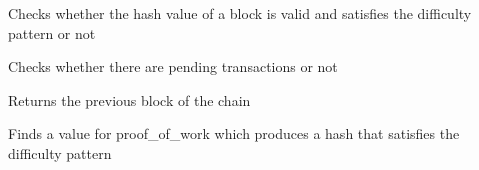 \documentclass[letterpaper,10pt,english]{sphinxmanual}
\begin{document}
\begin{fulllineitems}
\begin{fulllineitems}
\end{fulllineitems}


\begin{fulllineitems}
\label{\detokenize{index:blockchain.Blockchain.is_proof_valid}}
Checks whether the hash value of a block is valid
and satisfies the difficulty pattern or not

\end{fulllineitems}


\begin{fulllineitems}
\label{\detokenize{index:blockchain.Blockchain.pending_transactions}}
Checks whether there are pending transactions or not

\end{fulllineitems}


\begin{fulllineitems}
\label{\detokenize{index:blockchain.Blockchain.previous_block}}
Returns the previous block of the chain

\end{fulllineitems}


\begin{fulllineitems}
\label{\detokenize{index:blockchain.Blockchain.proof_of_work}}
Finds a value for proof\_of\_work which produces
a hash that satisfies the difficulty pattern

\end{fulllineitems}


\end{fulllineitems}
\end{document}
